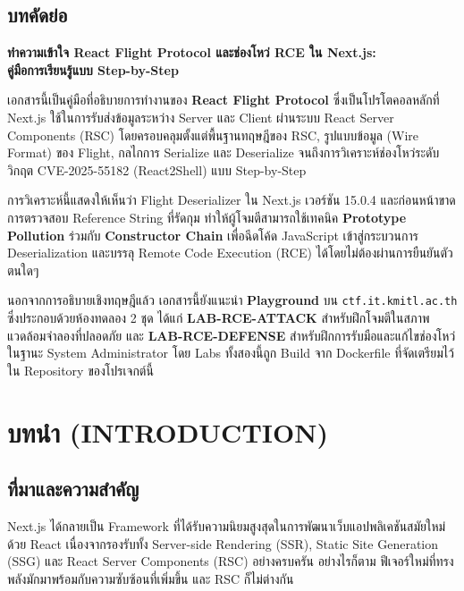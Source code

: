 \documentclass[12pt,oneside]{report}
\begin{document}
\section*{\centering บทคัดย่อ}
\begin{center}
    \textbf{ทำความเข้าใจ React Flight Protocol และช่องโหว่ RCE ใน Next.js: \\
    คู่มือการเรียนรู้แบบ Step-by-Step}
\end{center}
\vspace{0.5cm}

เอกสารนี้เป็นคู่มือที่อธิบายการทำงานของ \textbf{React Flight Protocol} ซึ่งเป็นโปรโตคอลหลักที่ Next.js ใช้ในการรับส่งข้อมูลระหว่าง Server และ Client ผ่านระบบ React Server Components (RSC) โดยครอบคลุมตั้งแต่พื้นฐานทฤษฎีของ RSC, รูปแบบข้อมูล (Wire Format) ของ Flight, กลไกการ Serialize และ Deserialize จนถึงการวิเคราะห์ช่องโหว่ระดับวิกฤต CVE-2025-55182 (React2Shell) แบบ Step-by-Step

การวิเคราะห์นี้แสดงให้เห็นว่า Flight Deserializer ใน Next.js เวอร์ชัน 15.0.4 และก่อนหน้าขาดการตรวจสอบ Reference String ที่รัดกุม ทำให้ผู้โจมตีสามารถใช้เทคนิค \textbf{Prototype Pollution} ร่วมกับ \textbf{Constructor Chain} เพื่อฉีดโค้ด JavaScript เข้าสู่กระบวนการ Deserialization และบรรลุ Remote Code Execution (RCE) ได้โดยไม่ต้องผ่านการยืนยันตัวตนใดๆ

นอกจากการอธิบายเชิงทฤษฎีแล้ว เอกสารนี้ยังแนะนำ \textbf{Playground} บน \texttt{ctf.it.kmitl.ac.th} ซึ่งประกอบด้วยห้องทดลอง 2 ชุด ได้แก่ \textbf{LAB-RCE-ATTACK} สำหรับฝึกโจมตีในสภาพแวดล้อมจำลองที่ปลอดภัย และ \textbf{LAB-RCE-DEFENSE} สำหรับฝึกการรับมือและแก้ไขช่องโหว่ในฐานะ System Administrator โดย Labs ทั้งสองนี้ถูก Build จาก Dockerfile ที่จัดเตรียมไว้ใน Repository ของโปรเจกต์นี้

\newpage
{}

\chapter{บทนำ (INTRODUCTION)}

\section{ที่มาและความสำคัญ}

Next.js ได้กลายเป็น Framework ที่ได้รับความนิยมสูงสุดในการพัฒนาเว็บแอปพลิเคชันสมัยใหม่ด้วย React เนื่องจากรองรับทั้ง Server-side Rendering (SSR), Static Site Generation (SSG) และ React Server Components (RSC) อย่างครบครัน อย่างไรก็ตาม ฟีเจอร์ใหม่ที่ทรงพลังมักมาพร้อมกับความซับซ้อนที่เพิ่มขึ้น และ RSC ก็ไม่ต่างกัน
\end{document}
